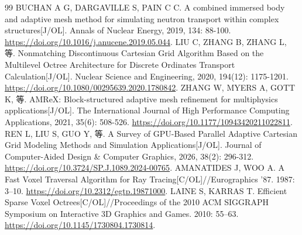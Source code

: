 \documentclass[UTF8, zihao=-4, fontset=none, a4paper]{ctexart}
\begin{document}
\begin{thebibliography}{99}
 BUCHAN A G, DARGAVILLE S, PAIN C C. A combined immersed body and adaptive mesh method for simulating neutron transport within complex structures{[}J/OL{]}. Annals of Nuclear Energy, 2019, 134: 88-100. \url{https://doi.org/10.1016/j.anucene.2019.05.044}.
 LIU C, ZHANG B, ZHANG L, 等. Nonmatching Discontinuous Cartesian Grid Algorithm Based on the Multilevel Octree Architecture for Discrete Ordinates Transport Calculation{[}J/OL{]}. Nuclear Science and Engineering, 2020, 194(12): 1175-1201. \url{https://doi.org/10.1080/00295639.2020.1780842}.
 ZHANG W, MYERS A, GOTT K, 等. AMReX: Block-structured adaptive mesh refinement for multiphysics applications{[}J/OL{]}. The International Journal of High Performance Computing Applications, 2021, 35(6): 508-526. \url{https://doi.org/10.1177/10943420211022811}.
 REN L, LIU S, GUO Y, 等. A Survey of GPU-Based Parallel Adaptive Cartesian Grid Modeling Methods and Simulation Applications{[}J/OL{]}. Journal of Computer-Aided Design \& Computer Graphics, 2026, 38(2): 296-312. \url{https://doi.org/10.3724/SP.J.1089.2024-00765}.
 AMANATIDES J, WOO A. A Fast Voxel Traversal Algorithm for Ray Tracing{[}C/OL{]}//Eurographics '87. 1987: 3--10. \url{https://doi.org/10.2312/egtp.19871000}.
 LAINE S, KARRAS T. Efficient Sparse Voxel Octrees{[}C/OL{]}//Proceedings of the 2010 ACM SIGGRAPH Symposium on Interactive 3D Graphics and Games. 2010: 55--63. \url{https://doi.org/10.1145/1730804.1730814}.


\end{thebibliography}
\end{document}
